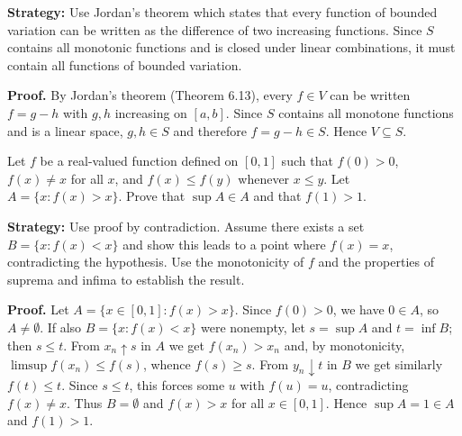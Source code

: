 \noindent\textbf{Strategy:} Use Jordan's theorem which states that every function of bounded variation can be written as the difference of two increasing functions. Since $S$ contains all monotonic functions and is closed under linear combinations, it must contain all functions of bounded variation.

\noindent\textbf{Proof.}
By Jordan’s theorem (Theorem 6.13), every $f\in V$ can be written $f=g-h$ with $g,h$ increasing on $[a,b]$. Since $S$ contains all monotone functions and is a linear space, $g,h\in S$ and therefore $f=g-h\in S$. Hence $V\subseteq S$.



\begin{problembox}
\begin{problemstatement}
Let $f$ be a real-valued function defined on $[0, 1]$ such that $f(0) > 0$, $f(x) \neq x$ for all $x$, and $f(x) \leq f(y)$ whenever $x \leq y$. Let $A = \{x: f(x) > x\}$. Prove that $\sup A \in A$ and that $f(1) > 1$.
\end{problemstatement}
\end{problembox}

\noindent\textbf{Strategy:} Use proof by contradiction. Assume there exists a set $B = \{x: f(x) < x\}$ and show this leads to a point where $f(x) = x$, contradicting the hypothesis. Use the monotonicity of $f$ and the properties of suprema and infima to establish the result.

\noindent\textbf{Proof.}
Let $A=\{x\in[0,1]: f(x)>x\}$. Since $f(0)>0$, we have $0\in A$, so $A\neq\emptyset$. If also $B=\{x: f(x)<x\}$ were nonempty, let $s=\sup A$ and $t=\inf B$; then $s\le t$. From $x_n\uparrow s$ in $A$ we get $f(x_n)>x_n$ and, by monotonicity, $\limsup f(x_n)\le f(s)$, whence $f(s)\ge s$. From $y_n\downarrow t$ in $B$ we get similarly $f(t)\le t$. Since $s\le t$, this forces some $u$ with $f(u)=u$, contradicting $f(x)\ne x$. Thus $B=\emptyset$ and $f(x)>x$ for all $x\in[0,1]$. Hence $\sup A=1\in A$ and $f(1)>1$.



